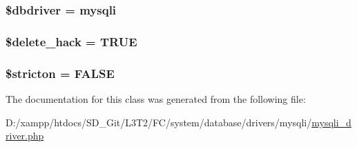 \subsubsection[{\$dbdriver}]{\setlength{\rightskip}{0pt plus 5cm}\$dbdriver = \textquotesingle{}mysqli\textquotesingle{}}\label{class_c_i___d_b__mysqli__driver_a0cde2a16322a023d040aa7f725877597}
\hypertarget{class_c_i___d_b__mysqli__driver_ad60008f32a478e978c7c3284f320f273}{}
\subsubsection[{\$delete\+\_\+hack}]{\setlength{\rightskip}{0pt plus 5cm}\$delete\+\_\+hack = T\+R\+U\+E}\label{class_c_i___d_b__mysqli__driver_ad60008f32a478e978c7c3284f320f273}
\hypertarget{class_c_i___d_b__mysqli__driver_afb42d9811bec1da94506e5764e1439e0}{}
\subsubsection[{\$stricton}]{\setlength{\rightskip}{0pt plus 5cm}\$stricton = F\+A\+L\+S\+E}\label{class_c_i___d_b__mysqli__driver_afb42d9811bec1da94506e5764e1439e0}


The documentation for this class was generated from the following file\+:\begin{DoxyCompactItemize}
\item 
D\+:/xampp/htdocs/\+S\+D\+\_\+\+Git/\+L3\+T2/\+F\+C/system/database/drivers/mysqli/\hyperlink{mysqli__driver_8php}{mysqli\+\_\+driver.\+php}\end{DoxyCompactItemize}
